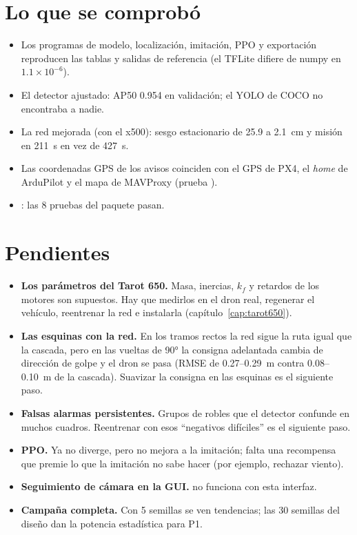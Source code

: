 \section{Lo que se comprobó}

\begin{itemize}
  \item Los programas de modelo, localización, imitación, PPO y exportación reproducen las tablas y
        salidas de referencia (el TFLite difiere de numpy en $1.1\times10^{-6}$).
  \item El detector ajustado: AP50 0.954 en validación; el YOLO de COCO no encontraba a nadie.
  \item La red mejorada (con el x500): sesgo estacionario de 25.9 a 2.1~cm y misión en 211~s en vez de
        427~s.
  \item Las coordenadas GPS de los avisos coinciden con el GPS de PX4, el \emph{home} de ArduPilot y el
        mapa de MAVProxy (prueba ).
  \item {}: las 8 pruebas del paquete pasan.
\end{itemize}

\section{Pendientes}

\begin{itemize}
  \item \textbf{Los parámetros del Tarot 650.} Masa, inercias, $k_f$ y retardos de los motores son
        supuestos. Hay que medirlos en el dron real, regenerar el vehículo, reentrenar la red e
        instalarla (capítulo~\ref{cap:tarot650}).
  \item \textbf{Las esquinas con la red.} En los tramos rectos la red sigue la ruta igual que la
        cascada, pero en las vueltas de 90° la consigna adelantada cambia de dirección de golpe y el
        dron se pasa (RMSE de 0.27--0.29~m contra 0.08--0.10~m de la cascada). Suavizar la consigna en las
        esquinas es el siguiente paso.
  \item \textbf{Falsas alarmas persistentes.} Grupos de robles que el detector confunde en muchos
        cuadros. Reentrenar con esos ``negativos difíciles'' es el siguiente paso.
  \item \textbf{PPO.} Ya no diverge, pero no mejora a la imitación; falta una recompensa que premie lo
        que la imitación no sabe hacer (por ejemplo, rechazar viento).
  \item \textbf{Seguimiento de cámara en la GUI.}  no funciona con esta interfaz.
  \item \textbf{Campaña completa.} Con 5 semillas se ven tendencias; las 30 semillas del diseño dan la
        potencia estadística para P1.
\end{itemize}
